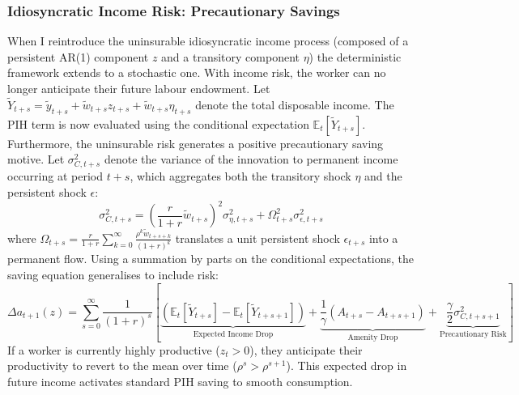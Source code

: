 \documentclass[12pt, a4paper]{article}
\begin{document}
\subsubsection*{Idiosyncratic Income Risk: Precautionary Savings}
When I reintroduce the uninsurable idiosyncratic income process (composed of a persistent AR(1) component $z$ and a transitory component $\eta$) the deterministic framework extends to a stochastic one. With income risk, the worker can no longer anticipate their future labour endowment. Let $\tilde{Y}_{t+s} = \tilde{y}_{t+s} + \tilde{w}_{t+s} z_{t+s} + \tilde{w}_{t+s} \eta_{t+s}$ denote the total disposable income. The PIH term is now evaluated using the conditional expectation $\mathbb{E}_t[\tilde{Y}_{t+s}]$. Furthermore, the uninsurable risk generates a positive precautionary saving motive. Let $\sigma_{C, t+s}^2$ denote the variance of the innovation to permanent income occurring at period $t+s$, which aggregates both the transitory shock $\eta$ and the persistent shock $\epsilon$:
\begin{equation}
    \sigma_{C, t+s}^2 = \left( \frac{r}{1+r} \tilde{w}_{t+s} \right)^2 \sigma_{\eta, t+s}^2 + \Omega_{t+s}^2 \sigma_{\epsilon, t+s}^2
    \label{eq:var_innovation}
\end{equation}
where $\Omega_{t+s} = \frac{r}{1+r} \sum_{k=0}^{\infty} \frac{\rho^k \tilde{w}_{t+s+k}}{(1+r)^k}$ translates a unit persistent shock $\epsilon_{t+s}$ into a permanent flow.
Using a summation by parts on the conditional expectations, the saving equation generalises to include risk:
\begin{equation}
    \Delta a_{t+1}(z) = \sum_{s=0}^{\infty} \frac{1}{(1+r)^s} \left[ \underbrace{\left(\mathbb{E}_t[\tilde{Y}_{t+s}] - \mathbb{E}_t[\tilde{Y}_{t+s+1}]\right)}_{\text{Expected Income Drop}} + \underbrace{\frac{1}{\gamma} (A_{t+s} - A_{t+s+1})}_{\text{Amenity Drop}} + \underbrace{\frac{\gamma}{2} \sigma_{C, t+s+1}^2}_{\text{Precautionary Risk}} \right]
    \label{eq:saving_stochastic}
\end{equation}
If a worker is currently highly productive ($z_t > 0$), they anticipate their productivity to revert to the mean over time ($\rho^s > \rho^{s+1}$). This expected drop in future income activates standard PIH saving to smooth consumption.
\end{document}
